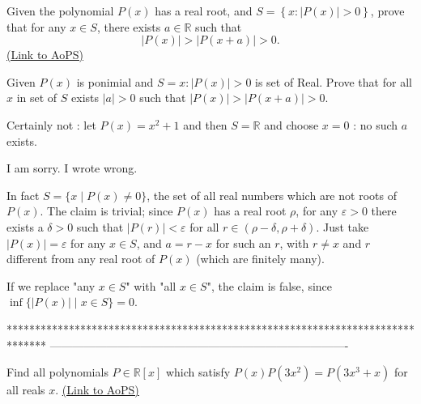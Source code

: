 \begin{problem}
	Given the polynomial $P(x)$ has a real root, and  $S=\left \{ x : |P(x)|>0\right \}$, prove that for any $x \in S$, there exists $a \in \mathbb{R}$ such that \[|P(x)|>|P(x+a)|>0.\]
	\flushright \href{https://artofproblemsolving.com/community/c6h441060}{(Link to AoPS)}
\end{problem}



\begin{solution}
	\begin{tcolorbox}Given $P(x)$ is ponimial and  $S=${$x:|P(x)|>0$}  is set of Real. Prove that for all $x$ in set of $S$ exists $|a|>0$ such that $|P(x)|>|P(x+a)|>0$.\end{tcolorbox}
Certainly not : let $P(x)=x^2+1$ and then $S=\mathbb R$ and choose $x=0$ : no such $a$ exists.
\end{solution}



\begin{solution}
	I am sorry. I wrote wrong.
\end{solution}



\begin{solution}
	In fact $S =  \{ x \mid P(x) \neq 0  \}$, the set of all real numbers which are not roots of $P(x)$. The claim is trivial; since $P(x)$ has a real root $\rho$, for any $\varepsilon >0$ there exists a $\delta > 0$ such that $|P(r)| < \varepsilon$ for all $r\in (\rho-\delta,\rho+\delta)$. Just take $|P(x)| = \varepsilon$ for any $x\in S$, and $a = r - x$ for such an $r$, with $r \neq x$ and $r$ different from any real root of $P(x)$ (which are finitely many).

If we replace "any $x\in S$" with "all $x\in S$", the claim is false, since $\inf  \{ |P(x)| \mid  x\in S \} = 0$.
\end{solution}
*******************************************************************************
-------------------------------------------------------------------------------

\begin{problem}
	Find all polynomials $P \in \mathbb R[x]$ which satisfy $P(x)P(3x^2)=P(3x^3+x)$ for all reals $x$.
	\flushright \href{https://artofproblemsolving.com/community/c6h441345}{(Link to AoPS)}
\end{problem}



